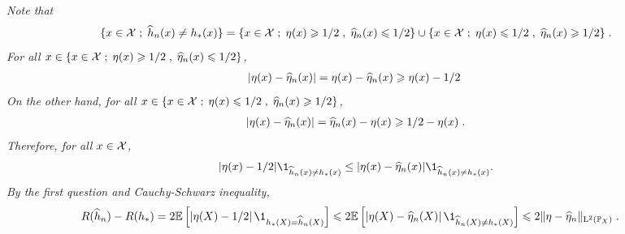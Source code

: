 \begin{enumerate}
{\em
Note that 
\[
\{x\in\mathcal{X}\;;\; \widehat h_n(x) \neq h_*(x)\} =  \{x\in\mathcal{X}\;;\; \eta(x) \geqslant 1/2\;,\;\widehat\eta_n(x) \leqslant 1/2\}\cup\{x\in\mathcal{X}\;;\; \eta(x) \leqslant 1/2\;,\;\widehat \eta_n(x) \geqslant 1/2\}\;.
\]
For all $x\in \{x\in\mathcal{X}\;;\; \eta(x) \geqslant 1/2\;,\;\widehat\eta_n(x) \leqslant 1/2\}$,
\begin{align*}
|\eta(x) - \widehat\eta_n(x)| = \eta(x) - \widehat\eta_n(x) \geqslant \eta(x) -1/2\;
\end{align*}
On the other hand, for all $x\in\{x\in\mathcal{X}\;;\; \eta(x) \leqslant 1/2\;,\;\widehat \eta_n(x) \geqslant 1/2\}$,
\begin{align*}
|\eta(x) - \widehat\eta_n(x)| = \widehat\eta_n(x) - \eta(x) \geqslant 1/2 - \eta(x)\;.
\end{align*}
Therefore, for all $x\in\mathcal{X}$,
\begin{align*}
|\eta(x) - 1/2| \1_{\widehat h_n(x) \neq h_*(x)}\leq |\eta(x) - \widehat \eta_n(x)| \1_{\widehat h_n(x) \neq h_*(x)}.
\end{align*}
By the first question and Cauchy-Schwarz inequality, 
\begin{align*}
R(\widehat h_n) - R(h_*) & = 2  \bE \left[ \left| \eta(X) - 1/2 \right| \1_{h_*(X) = \widehat h_n(X)}  \right] \leqslant 2 \bE \left[ \left|\eta(X) - \widehat \eta_n(X) \right| \1_{\widehat h_n(X) \neq h_*(X)}  \right] \leqslant 2 \|\eta - \widehat \eta_n \|_{\mathrm{L}^2(\bP_X)}\eqsp.
\end{align*}
}
\end{enumerate}


